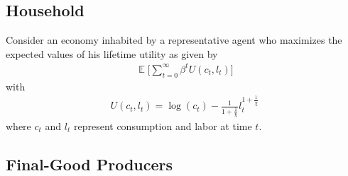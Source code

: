 \documentclass[12pt]{article}
\DeclareMathOperator{\E}{\mathbb{E}}
\begin{document}
\subsection{Household}

Consider an economy inhabited by a representative agent who maximizes the expected values of his lifetime utility as given by
\begin{eqnarray}\label{equation:utilFunc}
\E \Bigg[  \sum_{t=0}^{\infty} \beta^t U(c_t,l_t)  \Bigg]
\end{eqnarray}
with 
\begin{eqnarray*}
U(c_t,l_t) = \log(c_t) - \frac{1}{1+\frac{1}{\chi}} l_t^{1+\frac{1}{\chi}}
\end{eqnarray*}
where $c_t$ and $l_t$ represent consumption and labor at time $t$. 

\subsection{Final-Good Producers}
\end{document}
